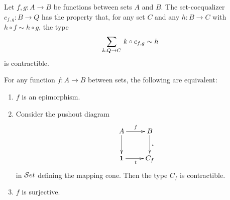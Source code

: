 
\begin{lem}
Let $f,g:A\to B$ be functions between sets $A$ and $B$. The 
{set-co}equalizer $c_{f,g}:B\to Q$ has the property that, for any set $C$ and any $h:B\to C$ with $h\circ f\sim h\circ g$, the type
\begin{equation*}
\sm{k:Q\to C} k\circ c_{f,g}\sim h
\end{equation*}
is contractible.
\end{lem}

\begin{lem}\label{epis-surj}
For any function $f:A\to B$ between sets, the following are equivalent:
\begin{enumerate}
\item $f$ is an epimorphism.
\item Consider the pushout diagram
\begin{equation*}
  \xymatrix{
    {A}
    \ar[r]^{f}
    \ar[d]
    &
    {B}
    \ar[d]^{\iota}
    \\
    {\unit}
    \ar[r]_{t}
    &
    {C_f}
  }
\end{equation*}
in $\mathcal{S}et$ defining the mapping cone. Then the type $C_f$ is contractible.
\item $f$ is surjective.
\end{enumerate}
\end{lem}

